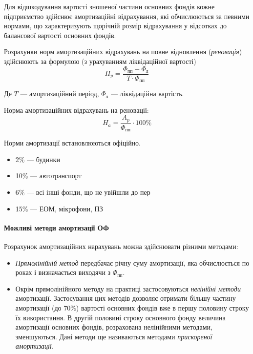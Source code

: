 \documentclass[a5paper,10pt,notitlepage,pdftex,headsepline]{scrartcl}
\begin{document}
      Для відшкодування вартості зношеної частини основних фондів кожне
      підприємство здійснює амортизаційні відрахування, які обчислюються за
      певними нормами, що характеризують щорічній розмір відрахування у
      відсотках до балансової вартості основних фондів.

      Розрахунки норм амортизаційних відрахувань на повне відновлення
      (\emph{реновація}) здійснюють за формулою (з урахуванням ліквідаційної
      вартості)
      \[
        H_p = \frac{\Phi_\text{пп} - \Phi_\text{л}}{T \cdot \Phi_\text{пп}}
      \]

      Де $T$ --- амортизаційний період, $\Phi_\text{л}$ --- ліквідаційна
      вартість.

      Норма амортизаційних відрахувань на реновації:
      \[
        H_a = \frac{A_p}{\Phi_\text{пп}} \cdot 100\%
      \]

      Норми амортизації встановлюються офіційно.
      \begin{itemize}
        \item 2\% --- будинки
        \item 10\% --- автотранспорт
        \item 6\% --- всі інші фонди, що не увійшли до пер
        \item 15\% --- ЕОМ, мікрофони, ПЗ
      \end{itemize}

      \paragraph{Можливі методи амортизації ОФ}
        Розрахунок амортизаційних нарахувань можна здійснювати різними
        методами:
        \begin{itemize}
          \item \emph{Прямолінійній метод} передбачає річну суму амортизації,
            яка обчислюється по  роках і визначається виходячи з $
            \Phi_\text{пп}$.
          \item Окрім прямолінійного методу на практиці застосовуються
            \emph{нелінійні методи} амортизації.
            Застосування цих методів дозволяє отримати більшу частину
            амортизації (до 70\%) вартості основних фондів вже в першу
            половину строку їх використання.
            В другій половині строку основного фонду величина амортизації
            основних фондів, розрахована нелінійними методами, зменшуються.
            Дані методи ще називаються методами \emph{прискореної амортизації}.
        \end{itemize}
\end{document}
